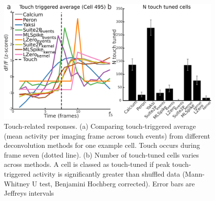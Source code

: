 \documentclass[a4paper,10pt,twocolumn]{article}
\begin{document}
\begin{figure}
\includegraphics[width=\textwidth]{full_figs_19v2/why_deconvolve_F6_19v2.png} 
\caption{\label{fig:touch_triggered} Touch-related responses. (a) Comparing touch-triggered average (mean activity per imaging frame across touch events) from different deconvolution methods for one example cell. Touch occurs during frame seven (dotted line). (b) Number of touch-tuned cells varies across methods. A cell is classed as touch-tuned if peak touch-triggered activity is significantly greater than shuffled data (Mann-Whitney U test, Benjamini Hochberg corrected). Error bars are Jeffreys intervals}
\end{figure}






%
\end{document}
